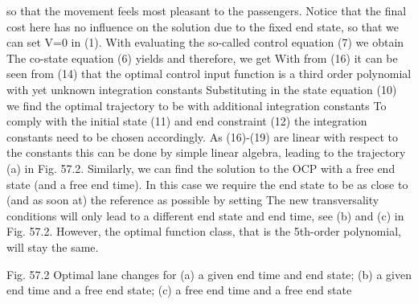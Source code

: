 so that the movement feels most pleasant to the passengers. Notice that the final cost here has no influence on the solution due to the fixed end state, so that we can set V=0 in (1).
With 
evaluating the so-called control equation (7) we obtain
The co-state equation (6) yields
and therefore, we get
With 
from (16) it can be seen from (14) that the optimal control input function is a third order polynomial with yet unknown integration constants 
Substituting 
in the state equation (10) we find the optimal trajectory to be
with additional integration constants %
To comply with the initial state (11) and end constraint (12) the integration constants need to be chosen accordingly. As (16)-(19) are linear with respect to the constants this can be done by simple linear algebra, leading to the trajectory (a) in Fig. 57.2. 
Similarly, we can find the solution to the OCP with a free end state (and a free end time). In this case we require the end state to be as close to (and as soon at) the reference as possible by setting
The new transversality conditions will only lead to a different end state and end time, see (b) and (c) in Fig. 57.2. However, the optimal function class, that is the 5th-order polynomial, will stay the same.

Fig. 57.2 Optimal lane changes for (a) a given end time and end state; (b) a given end time and a free end state; (c) a free end time and a free end state


